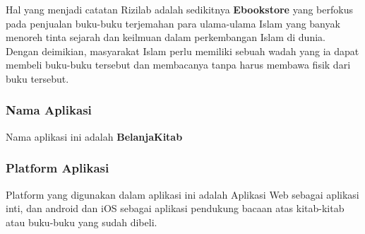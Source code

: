 \documentclass[Rizilab.tex]{subfile}
\begin{document}
    Hal yang menjadi catatan Rizilab adalah sedikitnya {\bfseries Ebookstore} yang berfokus pada penjualan buku-buku terjemahan para ulama-ulama Islam yang banyak menoreh tinta sejarah dan keilmuan dalam perkembangan Islam di dunia. Dengan deimikian, masyarakat Islam perlu memiliki sebuah wadah yang ia dapat membeli buku-buku tersebut dan membacanya tanpa harus membawa fisik dari buku tersebut.
   \subsubsection{Nama Aplikasi}
    Nama aplikasi ini adalah {\bfseries BelanjaKitab}
   \subsubsection{Platform Aplikasi}
    Platform yang digunakan dalam aplikasi ini adalah Aplikasi Web sebagai aplikasi inti, dan android dan iOS sebagai aplikasi pendukung bacaan atas kitab-kitab atau buku-buku yang sudah dibeli.
\end{document}

